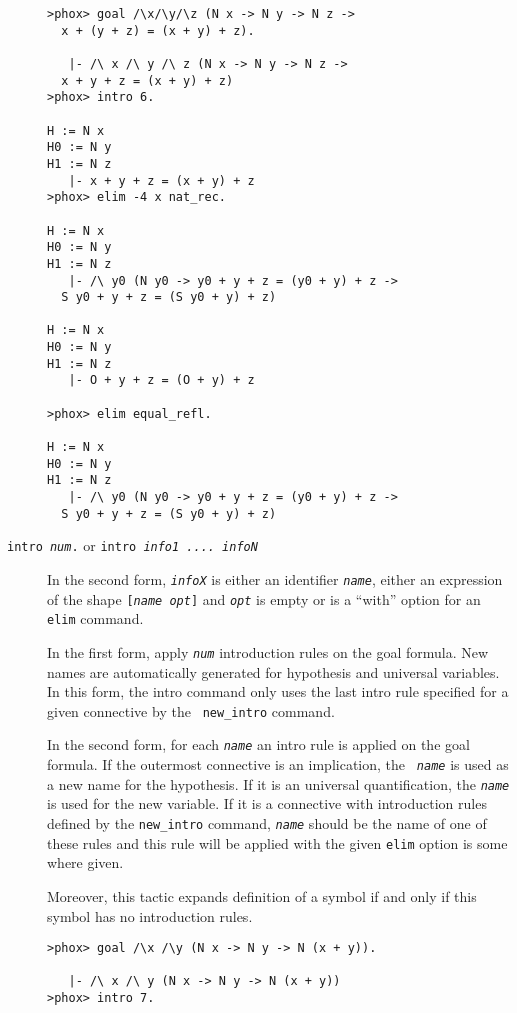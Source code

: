 \begin{description}
\begin{verbatim}
>phox> goal /\x/\y/\z (N x -> N y -> N z -> 
  x + (y + z) = (x + y) + z).

   |- /\ x /\ y /\ z (N x -> N y -> N z -> 
  x + y + z = (x + y) + z)
>phox> intro 6. 

H := N x
H0 := N y
H1 := N z
   |- x + y + z = (x + y) + z
>phox> elim -4 x nat_rec. 

H := N x
H0 := N y
H1 := N z
   |- /\ y0 (N y0 -> y0 + y + z = (y0 + y) + z -> 
  S y0 + y + z = (S y0 + y) + z)

H := N x
H0 := N y
H1 := N z
   |- O + y + z = (O + y) + z

>phox> elim equal_refl.

H := N x
H0 := N y
H1 := N z
   |- /\ y0 (N y0 -> y0 + y + z = (y0 + y) + z -> 
  S y0 + y + z = (S y0 + y) + z)
\end{verbatim}

\item[{\tt intro {\em num}.} or {\tt intro {\em info1 .... infoN}} \idx{intro}]

  In the second form,  {\tt \em infoX} is either an identifier {\tt \em name}, either an expression
of the shape {\tt [{\em  name opt}]} and {\tt \em opt} is empty or is
a ``with'' option for an {\tt elim} command.

  In the first form, apply {\tt\em num} introduction rules on the goal
  formula. New names are automatically generated for hypothesis and
  universal variables. In this form, the intro command only uses the
  last intro rule specified for a given connective by the {\tt
    new\_intro} command.

  In the second form, for each {\tt\em name} an intro rule is applied on the
  goal formula. If the outermost connective is an implication, the {\tt\em
    name} is used as a new name for the hypothesis. If it is an universal
  quantification, the {\tt\em name} is used for the new variable. If it is a
  connective with introduction rules defined by the {\tt new\_intro} command,
  {\tt\em name} should be the name of one of these rules and this rule will be
  applied with the given {\tt elim} option is some where given. 

Moreover, this tactic expands definition of a symbol if and only if
  this symbol has no introduction rules.

\begin{verbatim}
>phox> goal /\x /\y (N x -> N y -> N (x + y)).

   |- /\ x /\ y (N x -> N y -> N (x + y))
>phox> intro 7.


\end{verbatim}
\end{description}
